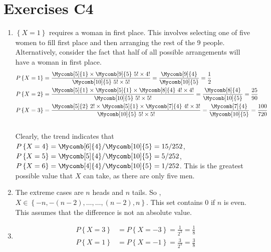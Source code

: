 \chapter*{Exercises C4}

\begin{enumerate}
	\item $ \left\{X = 1 \right\}$ requires a woman in first place. This involves selecting one of five women to fill first place and then arranging the rest of the 9 people. Alternatively, consider the fact that half of all possible arrangements will have a woman in first place.\\
	\begin{align}
		P \left\{X = 1 \right\} &= \frac{\Mycomb[5]{1} \times \Mycomb[9]{5} \ 5! \times 4!}{\Mycomb[10]{5} \ 5! \times 5!} = \frac{\Mycomb[9]{4}}{\Mycomb[10]{5}} = \frac{1}{2} \nonumber \\
		P \left\{X = 2 \right\} &= \frac{\Mycomb[5]{1} \times \Mycomb[5]{1} \times \Mycomb[8]{4}\ 4! \times 4!}{\Mycomb[10]{5} \ 5! \times 5!} = \frac{\Mycomb[8]{4}}{\Mycomb[10]{5}} = \frac{25}{90} \nonumber \\
		P \left\{X = 3 \right\} &= \frac{\Mycomb[5]{2}\ 2! \times \Mycomb[5]{1} \times \Mycomb[7]{4}\ 4! \times 3!}{\Mycomb[10]{5} \ 5! \times 5!} = \frac{\Mycomb[7]{4}}{\Mycomb[10]{5}} = \frac{100}{720}
	\end{align}\\
	
	Clearly, the trend indicates that \\
	$ P \left\{X = 4 \right\}  = \Mycomb[6]{4} / \Mycomb[10]{5} = 15/252$, \\
	$ P \left\{X = 5 \right\}  = \Mycomb[5]{4} / \Mycomb[10]{5} = 5/252$, \\
	$ P \left\{X = 6 \right\}  = \Mycomb[4]{4} / \Mycomb[10]{5} = 1/252$. This is the greatest possible value that $ X $ can take, as there are only five men. \\
	
	\item The extreme cases are $ n $ heads and $ n $ tails. So , \\
	$ X \in \left\{-n, -(n-2), \dots, \dots, (n-2), n \right\} $. This set contains $ 0 $ if $ n $ is even. This assumes that the difference is not an absolute value. \\
	
	\item \begin{align}
		P \left\{X = 3 \right\} &= P \left\{X = -3 \right\} = \frac{1}{2^3} = \frac{1}{8} \nonumber \\
		P \left\{X = 1 \right\} &= P \left\{X = -1 \right\} = \frac{3}{2^3} = \frac{3}{8}
	\end{align}\\
	

\end{enumerate}
